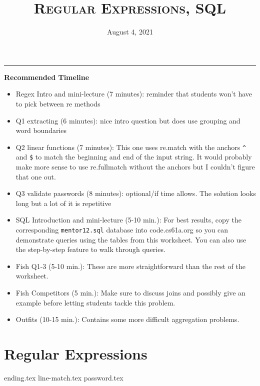 \documentclass{exam}
\title{\textsc{Regular Expressions, SQL}}
\date{August 4, 2021}
\begin{document}
\maketitle
\rule{\textwidth}{0.15em}
\fontsize{12}{15}\selectfont

\begin{guide}
\begin{blocksection}
    \textbf{Recommended Timeline}
    \begin{itemize}
        \item Regex Intro and mini-lecture (7 minutes): reminder that students won't have to pick between re methods
        \item Q1 extracting (6 minutes): nice intro question but does use grouping and word boundaries
        \item Q2 linear functions (7 minutes): This one uses re.match with the anchors \lstinline{^} and \lstinline{$} to match the beginning and end of the input string.
        It would probably make more sense to use re.fullmatch without the anchors but I couldn't figure that one out.
        \item Q3 validate passwords (8 minutes): optional/if time allows. The solution looks long but a lot of it is repetitive
        \item SQL Introduction and mini-lecture (5-10 min.): For best results, copy the corresponding 
        \texttt{mentor12.sql} database into code.cs61a.org so you can demonstrate queries using 
        the tables from this worksheet. You can also use the step-by-step feature to walk through queries.
        \item Fish Q1-3 (5-10 min.): These are more straightforward than the rest of
        the worksheet.
        \item Fish Competitors (5 min.): Make sure to discuss joins and possibly give an example
        before letting students tackle this problem.
        \item Outfits (10-15 min.): Contains some more difficult aggregation problems.
    \end{itemize}
\end{blocksection}
\newpage
\end{guide}

\section{Regular Expressions}
\begin{questions}
{ending.tex}
{line-match.tex}
{password.tex}
\end{questions}
\end{document}
